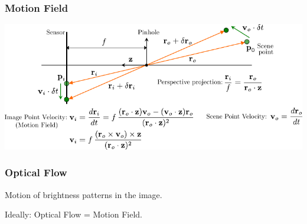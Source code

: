 \begin{frame}
  \frametitle{Motion Field}
  \begin{center}
    \includegraphics[width=\columnwidth]{./images/optical_flow/motion_field.pdf}
  \end{center}

\end{frame}


\begin{frame}
  \frametitle{Optical Flow}
Motion of brightness patterns in the image.

Ideally: Optical Flow = Motion Field.

\vspace{0.5cm}
\centering
\end{frame}


